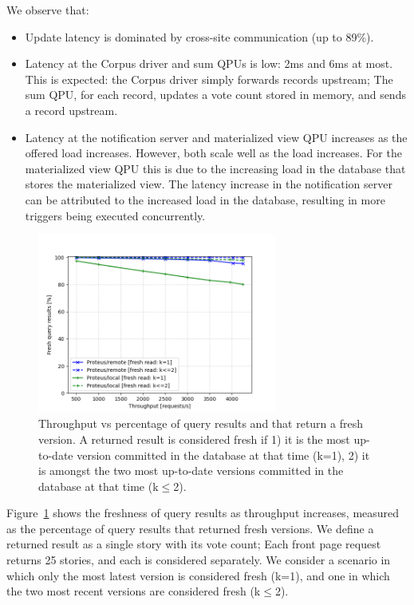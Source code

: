 We observe that:
\begin{itemize}
  \item Update latency is dominated by cross-site communication  (up to 89\%).
  \item Latency at the Corpus driver and sum QPUs is low: 2ms and 6ms at most.
  This is expected: the Corpus driver simply forwards records upstream;
  The sum QPU, for each record, updates a vote count stored in memory, and sends a record upstream.
  \item Latency at the notification server and materialized view QPU increases as the offered load increases.
  However, both scale well as the load increases.
  For the materialized view QPU this is due to the increasing load in the database that stores the materialized view.
  The latency increase in the notification server can be attributed to the increased load in the database,
  resulting in more triggers being executed concurrently.
\end{itemize}

\begin{figure}[H]
\centering
  \includegraphics[width=0.7\textwidth]{./figures/evaluation/fresh_reads_throughput.png}
  \caption{Throughput vs percentage of query results and that return a fresh version.
  A returned result is considered fresh if 1) it is the most up-to-date version committed in the database at that time (k=1),
  2) it is amongst the two most up-to-date versions committed in the database at that time (k$\leq$2).}
  \label{fig:fresh_reads_throughput}
\end{figure}

\bigskip
\noindent
Figure~\ref{fig:fresh_reads_throughput} shows the freshness of query results as throughput increases,
measured as the percentage of query results that returned fresh versions.
We define a returned result as a single story with its vote count;
Each front page request returns 25 stories, and each is considered separately.
We consider a scenario in which only the most latest version is considered fresh (k=1),
and one in which the two most recent versions are considered fresh (k$\leq$2).

